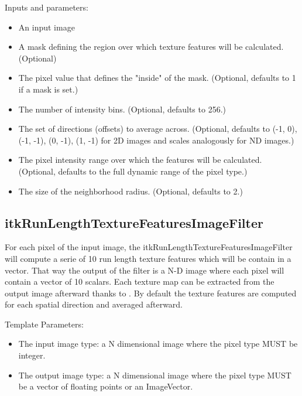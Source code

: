 \documentclass{InsightArticle}
\begin{document}
Inputs and parameters:
\begin{itemize}
 \item An input image
 \item A mask defining the region over which texture features will be calculated. (Optional)
 \item The pixel value that defines the "inside" of the mask. (Optional, defaults to 1 if a mask is set.)
 \item The number of intensity bins. (Optional, defaults to 256.)
 \item The set of directions (offsets) to average across. (Optional, defaults to {(-1, 0), (-1, -1), (0, -1), (1, -1)} for 2D images and scales analogously for ND images.)
 \item The pixel intensity range over which the features will be calculated. (Optional, defaults to the full dynamic range of the pixel type.)
 \item The size of the neighborhood radius. (Optional, defaults to 2.)
\end{itemize}

\subsection{itkRunLengthTextureFeaturesImageFilter}
\label{sec:RLFilter}

For each pixel of the input image, the itkRunLengthTextureFeaturesImageFilter will compute a serie of 10 run length texture features which will be contain in a vector. That way the output of the filter is a N-D image where each pixel will contain a vector of 10 scalars. Each texture map can be extracted from the output image afterward thanks to . By default the texture features are computed for each spatial direction and averaged afterward.

Template Parameters:
\begin{itemize}
 \item The input image type: a N dimensional image where the pixel type MUST be integer.
 \item The output image type: a N dimensional image where the pixel type MUST be a vector of floating points or an ImageVector.
\end{itemize}
\end{document}
